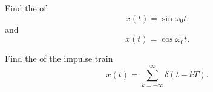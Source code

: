 \begin{frame}[plain]
    \begin{example}
        Find the \ft of
            \begin{equation*}
                x(t) = \sin \omega_0 t.
            \end{equation*}
            and
            \begin{equation*}
                x(t) = \cos \omega_0 t.
            \end{equation*}
    \end{example}
\end{frame}

\begin{frame}[plain]
    \begin{example}
        Find the \ft of the impulse train
        \begin{equation*}
            x(t) = \sum_{k=-\infty}^{\infty} \delta(t-kT).
        \end{equation*}
    \end{example}
\end{frame}



